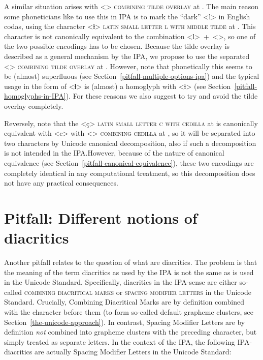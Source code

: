 A similar situation arises with <> \textsc{combining tilde overlay} at
. The main reason some phoneticians like to use this in IPA is to mark
the ``dark'' <l> in English codas, using the character <ɫ> \textsc{latin small
letter l with middle tilde} at . This character is not canonically
equivalent to the combination <l>~+~<>, so one of the two possible
encodings has to be chosen. Because the tilde overlay is described as a general
mechanism by the IPA, we propose to use the separated <>
\textsc{combining tilde overlay} at . However, note that phonetically 
this seems to be (almost) superfluous (see Section~\ref{pitfall-multiple-options-ipa}) 
and the typical usage in the form of <ɫ> is (almost) a homoglyph with <ɬ> (see 
Section~\ref{pitfall-homoglyphs-in-IPA}). For these reasons we also suggest to try 
and avoid the tilde overlay completely.

Reversely, note that the <ç> \textsc{latin small letter c with cedilla} at
 is canonically equivalent with <c> with <>
\textsc{combining cedilla} at , so it will be separated into two
characters by Unicode canonical decomposition, also if such a decomposition is
not intended in the IPA.\@ However, because of the nature of canonical
equivalence (see Section~\ref{pitfall-canonical-equivalence}), these two
encodings are completely identical in any computational treatment, so this
decomposition does not have any practical consequences.

\section{Pitfall: Different notions of diacritics}
\label{pitfall-different-notions-of-diacritics}


Another pitfall relates to the question of what are diacritics. The problem is that
the meaning of the term diacritics as used by the IPA is not the same as is used
in the Unicode Standard. Specifically, diacritics in the IPA-sense are either
so-called \textsc{combining diacritical marks} or \textsc{spacing modifier
letters} in the Unicode Standard. Crucially, Combining Diacritical Marks are by
definition combined with the character before them (to form so-called default
grapheme clusters, see Section~\ref{the-unicode-approach}). In contrast, Spacing
Modifier Letters are by definition \emph{not} combined into grapheme clusters
with the preceding character, but simply treated as separate letters. In the
context of the IPA, the following IPA-diacritics are actually Spacing Modifier
Letters in the Unicode Standard:

